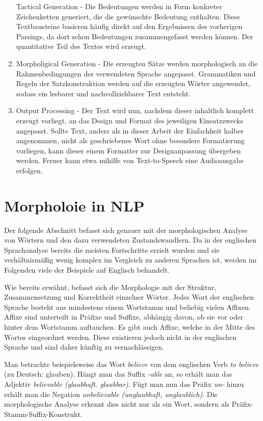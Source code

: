 \documentclass[12pt]{report}
\begin{document}
\begin{enumerate}
Tactical Generation - Die Bedeutungen werden in Form konkreter Zeichenketten generiert, die die gewünschte Bedeutung enthalten. Diese Textbausteine basieren häufig direkt auf den Ergebnissen des vorherigen Parsings, da dort schon Bedeutungen zusammengefasst werden können. Der quantitative Teil des Textes wird erzeugt.
\item
Morpholigical Generation - Die erzeugten Sätze werden morphologisch an die Rahmenbedingungen der verwendeten Sprache angepasst. Grammatiken und Regeln der Satzkonstruktion werden auf die erzeugten Wörter angewendet, sodass ein lesbarer und nachvollziehbarer Text entsteht.
\item
Output Processing - Der Text wird nun, nachdem dieser inhaltlich komplett erzeugt vorliegt, an das Design und Format des jeweiligen Einsatzzwecks angepasst. Sollte Text, anders als in dieser Arbeit der Einfachheit halber angenommen, nicht als geschriebenes Wort ohne besondere Formatierung vorliegen, kann dieser einem Formatter zur Designanpassung übergeben werden. Ferner kann etwa mihilfe von Text-to-Speech eine Audioausgabe erfolgen. 
\end{enumerate}

\section{Morpholoie in NLP}
Der folgende Abschnitt befasst sich genauer mit der morphologischen Analyse von Wörtern und den dazu verwendeten Zustandswandlern. Da in der englischen Sprachanalyse bereits die meisten Fortschritte erzielt wurden und sie verhältnismäßig wenig komplex im Vergleich zu anderen Sprachen ist, werden im Folgenden viele der Beispiele auf Englisch behandelt. 

Wie bereits erwähnt, befasst sich die Morphologie mit der Struktur, Zusammensetzung und Korrektheit einzelner Wörter. Jedes Wort der englischen Sprache besteht aus mindestens einem Wortstamm und beliebig vielen Affixen. Affixe sind unterteilt in Präfixe und Suffixe, abhängig davon, ob sie vor oder hinter dem Wortstamm auftauchen. Es gibt auch Affixe, welche in der Mitte des Wortes eingeordnet werden. Diese existieren jedoch nicht in der englischen Sprache und sind daher künftig zu vernachlässigen.

Man betrachte beispielsweise das Wort \textit{\glqq  believe\grqq{}} von dem englischen Verb \textit{\glqq  to believe\grqq{}} (zu Deutsch: \glqq  glauben\grqq{}). Hängt man das Suffix \textit{\glqq  -able\grqq{}} an, so erhält man das Adjektiv \textit{\glqq  believable\grqq{} (\glqq  glaubhaft\grqq{}. \glqq  glaubbar\grqq{})}. Fügt man nun das Präfix \textit{\glqq  un-\grqq{}} hinzu erhält man die Negation \textit{\glqq  unbelievable\grqq{} (\glqq  unglaubhaft\grqq{}, \glqq  unglaublich\grqq{})}. Die morphologische Analyse erkennt dies nicht nur als ein Wort, sondern als Präfix-Stamm-Suffix-Konstrukt.
\end{document}
